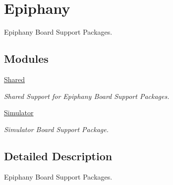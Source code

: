 \hypertarget{group__RTEMSBSPsEpiphany}{}\section{Epiphany}
\label{group__RTEMSBSPsEpiphany}


Epiphany Board Support Packages.  


\subsection*{Modules}
\begin{DoxyCompactItemize}
\item 
\mbox{\hyperlink{group__RTEMSBSPsEpiphanyShared}{Shared}}
\begin{DoxyCompactList}\small\item\em Shared Support for Epiphany Board Support Packages. \end{DoxyCompactList}\item 
\mbox{\hyperlink{group__RTEMSBSPsEpiphanySim}{Simulator}}
\begin{DoxyCompactList}\small\item\em Simulator Board Support Package. \end{DoxyCompactList}\end{DoxyCompactItemize}


\subsection{Detailed Description}
Epiphany Board Support Packages. 

